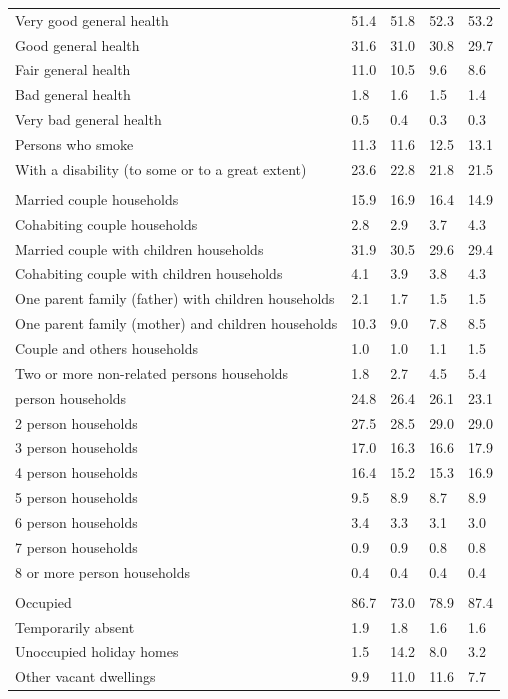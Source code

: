 \documentclass{article}
\begin{document}
\begin{table}[h]
\begin{tabular}{KTTTT}
    \hline
Very good general health & 51.4& 51.8&52.3& 53.2\\
Good general health & 31.6& 31.0& 30.8& 29.7\\
Fair general health & 11.0& 10.5& 9.6&  8.6\\
Bad general health & 1.8& 1.6&1.5& 1.4\\
Very bad general health & 0.5& 0.4&0.3& 0.3\\
    \hline
Persons who smoke & 11.3& 11.6&12.5& 13.1\\
    \hline
With a disability (to some or to a great extent) & 23.6& 22.8&21.8& 21.5\\
\hline
    \\ 
    \hline
Married couple households & 15.9& 16.9& 16.4& 14.9\\
Cohabiting couple households & 2.8& 2.9& 3.7& 4.3\\
Married couple with children households & 31.9& 30.5& 29.6& 29.4\\
Cohabiting couple with children households & 4.1& 3.9& 3.8& 4.3\\
One parent family (father) with  children households & 2.1& 1.7& 1.5& 1.5\\
One parent family (mother) and children households & 10.3&  9.0&  7.8&  8.5\\
Couple and others households  & 1.0& 1.0& 1.1& 1.5\\
Two or more non-related persons households & 1.8& 2.7& 4.5& 5.4\\
     person households & 24.8& 26.4& 26.1& 23.1\\
2 person households & 27.5& 28.5& 29.0& 29.0\\
3 person households & 17.0& 16.3& 16.6& 17.9\\
4 person households & 16.4& 15.2& 15.3& 16.9\\
5 person households & 9.5& 8.9& 8.7& 8.9\\
6 person households & 3.4& 3.3& 3.1& 3.0\\
7 person households & 0.9& 0.9& 0.8& 0.8\\
8 or more person households & 0.4& 0.4& 0.4& 0.4\\
\hline
    \\ 
    \hline
Occupied & 86.7& 73.0& 78.9& 87.4\\
Temporarily absent & 1.9& 1.8& 1.6& 1.6\\
Unoccupied holiday homes &  1.5& 14.2&  8.0&  3.2\\
Other vacant dwellings &  9.9& 11.0& 11.6&  7.7\\
\hline
\end{tabular}
\end{table}
\end{document}
